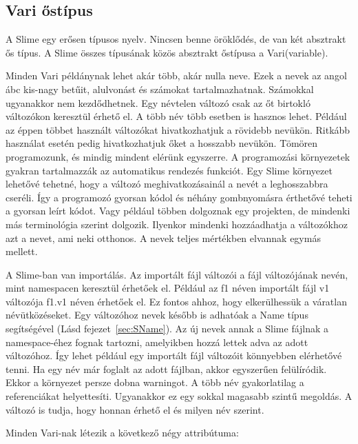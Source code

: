 \subsection{Vari őstípus}
\label{sec:SVariSuper}
A Slime egy erősen típusos nyelv.
Nincsen benne öröklődés, de van két absztrakt ős típus.
A Slime összes típusának közös absztrakt őstípusa a Vari(variable).

Minden Vari példánynak lehet akár több, akár nulla neve.
Ezek a nevek az angol ábc kis-nagy betűit, alulvonást és számokat tartalmazhatnak. 
Számokkal ugyanakkor nem kezdődhetnek.
Egy névtelen változó csak az őt birtokló változókon keresztül érhető el.
A több név több esetben is hasznos lehet.
Például az éppen többet használt változókat hivatkozhatjuk a rövidebb nevükön.
Ritkább használat esetén pedig hivatkozhatjuk őket a hosszabb nevükön.
Tömören programozunk, és mindig mindent elérünk egyszerre.
A programozási környezetek gyakran tartalmazzák az automatikus rendezés funkciót.
Egy Slime környezet lehetővé tehetné, hogy a változó meghivatkozásainál a nevét a leghosszabbra cseréli.
Így a programozó gyorsan kódol és néhány gombnyomásra érthetővé teheti a gyorsan leírt kódot.
Vagy például többen dolgoznak egy projekten, de mindenki más terminológia szerint dolgozik.
Ilyenkor mindenki hozzáadhatja a változókhoz azt a nevet, ami neki otthonos.
A nevek teljes mértékben elvannak egymás mellett.

A Slime-ban van importálás.
Az importált fájl változói a fájl változójának nevén, mint namespacen keresztül érhetőek el.
Például az f1 néven importált fájl v1 változója f1.v1 néven érhetőek el.
Ez fontos ahhoz, hogy elkerülhessük a váratlan névütközéseket.
Egy változóhoz nevek később is adhatóak a Name típus segítségével (Lásd fejezet~\ref{sec:SName}).
Az új nevek annak a Slime fájlnak a namespace-éhez fognak tartozni, amelyikben hozzá lettek adva az adott változóhoz. 
Így lehet például egy importált fájl változóit könnyebben elérhetővé tenni.
Ha egy név már foglalt az adott fájlban, akkor egyszerűen felülíródik.
Ekkor a környezet persze dobna warningot.
A több név gyakorlatilag a referenciákat helyettesíti.
Ugyanakkor ez egy sokkal magasabb szintű megoldás.
A változó is tudja, hogy honnan érhető el és milyen név szerint.

Minden Vari-nak létezik a következő négy attribútuma:

